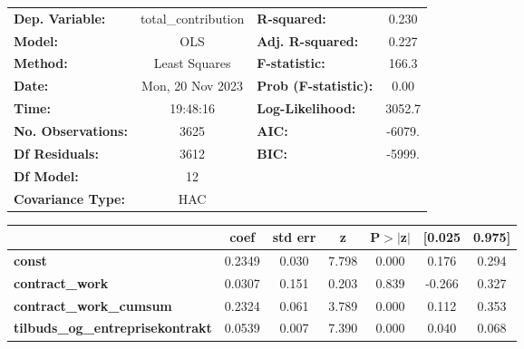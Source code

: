\begin{center}
\begin{tabular}{lclc}
\toprule
\textbf{Dep. Variable:}                     & total\_contribution & \textbf{  R-squared:         } &     0.230   \\
\textbf{Model:}                             &         OLS         & \textbf{  Adj. R-squared:    } &     0.227   \\
\textbf{Method:}                            &    Least Squares    & \textbf{  F-statistic:       } &     166.3   \\
\textbf{Date:}                              &   Mon, 20 Nov 2023  & \textbf{  Prob (F-statistic):} &     0.00    \\
\textbf{Time:}                              &       19:48:16      & \textbf{  Log-Likelihood:    } &    3052.7   \\
\textbf{No. Observations:}                  &          3625       & \textbf{  AIC:               } &    -6079.   \\
\textbf{Df Residuals:}                      &          3612       & \textbf{  BIC:               } &    -5999.   \\
\textbf{Df Model:}                          &            12       & \textbf{                     } &             \\
\textbf{Covariance Type:}                   &         HAC         & \textbf{                     } &             \\
\bottomrule
\end{tabular}
\begin{tabular}{lcccccc}
                                            & \textbf{coef} & \textbf{std err} & \textbf{z} & \textbf{P$> |$z$|$} & \textbf{[0.025} & \textbf{0.975]}  \\
\midrule
\textbf{const}                              &       0.2349  &        0.030     &     7.798  &         0.000        &        0.176    &        0.294     \\
\textbf{contract\_work}                     &       0.0307  &        0.151     &     0.203  &         0.839        &       -0.266    &        0.327     \\
\textbf{contract\_work\_cumsum}             &       0.2324  &        0.061     &     3.789  &         0.000        &        0.112    &        0.353     \\
\textbf{tilbuds\_og\_entreprisekontrakt}    &       0.0539  &        0.007     &     7.390  &         0.000        &        0.040    &        0.068     \\

\end{tabular}
\end{center}

